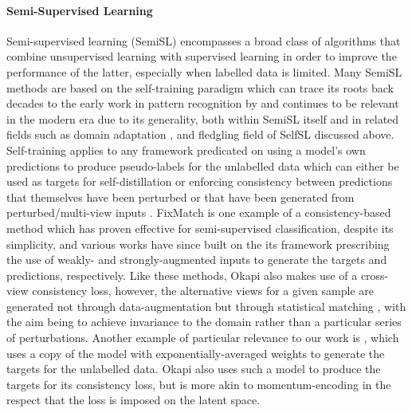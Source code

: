 \paragraph{Semi-Supervised Learning}  
Semi-supervised learning (SemiSL) encompasses a broad class of algorithms that combine unsupervised
learning with supervised learning in order to improve the performance of the latter, especially
when labelled data is limited.
%
Many \ac{SemiSL} methods are based on the self-training paradigm which can trace its roots back
decades to the early work in pattern recognition by \citet{scudder1965probability} and continues to
be relevant in the modern era due to its generality, both within \ac{SemiSL} itself and in related
fields such as domain adaptation \citep{ganin2016domain}, and fledgling field of \ac{SelfSL}
\citep{caron2021emerging} discussed above.
%
Self-training applies to any framework predicated on using a model's own predictions to produce
pseudo-labels for the unlabelled data which can either be used as targets for self-distillation
\citep{xie2020self} or enforcing consistency between predictions that themselves have been
perturbed \citep{bachman2014learning, xie2020self} or that have been generated from
perturbed/multi-view inputs \citep{sohn2020fixmatch}.
%
FixMatch \citep{sohn2020fixmatch} is one example of a consistency-based method which has proven
effective for semi-supervised classification, despite its simplicity, and various works
\citep{gong2021alphamatch, lienen2021credal} have since built on the its framework prescribing the
use of weakly- and strongly-augmented inputs to generate the targets and predictions, respectively.
%
Like these methods, Okapi also makes use of a cross-view consistency loss, however, the alternative
views for a given sample are generated not through data-augmentation but through statistical
matching \citep{rosenbaum1983central}, with the aim being to achieve invariance to the domain
rather than a particular series of perturbations.
%
Another example of particular relevance to our work is \citet{tarvainen2017mean}, which uses a copy
of the model with exponentially-averaged weights to generate the targets for the unlabelled data.
Okapi also uses such a model to produce the targets for its consistency loss, but is more akin to
momentum-encoding \citep{he2020momentum} in the respect that the loss is imposed on the latent
space.
